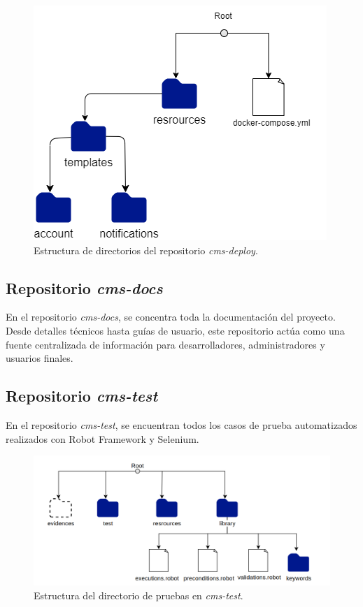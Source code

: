 \begin{figure}[H]
    \centering
    \includegraphics[width=0.5\linewidth]{fig/deploy-directory.png}
    \caption{Estructura de directorios del repositorio \textit{cms-deploy}.}
    \label{fig:deploy-directory}
\end{figure}

\subsection{Repositorio \textit{cms-docs}}

En el repositorio \textit{cms-docs}, se concentra toda la documentación del proyecto. Desde detalles técnicos hasta guías de usuario, este repositorio actúa como una fuente centralizada de información para desarrolladores, administradores y usuarios finales.

\subsection{Repositorio \textit{cms-test}}
En el repositorio \textit{cms-test}, se encuentran todos los casos de prueba automatizados realizados con Robot Framework y Selenium.

\begin{figure}[H]
\centering
\includegraphics[width=0.9\linewidth]{fig/test-directory.png}
\caption{Estructura del directorio de pruebas en \textit{cms-test}.}
\label{fig:test-directory}
\end{figure}

